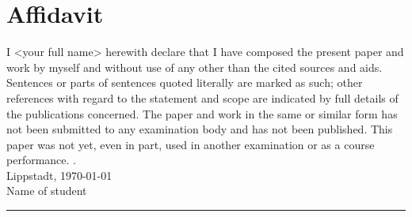 \listoffigures				%
\listoftables				%

\chapter*{Affidavit}
I <your full name> herewith declare that I have composed the present paper and work by myself and without use of any other than the cited sources and aids. Sentences or parts of sentences quoted literally are marked as such; other references with regard to the statement and scope are indicated by full details of the publications concerned. The paper and work in the same or similar form has not been submitted to any examination body and has not been published. This paper was not yet, even in part, used in another examination or as a course performance.
. ~\\
Lippstadt,  \today\\[.6cm] %
Name of student\\ %
\rule[0.5em]{20em}{0.5pt}

\appendix




